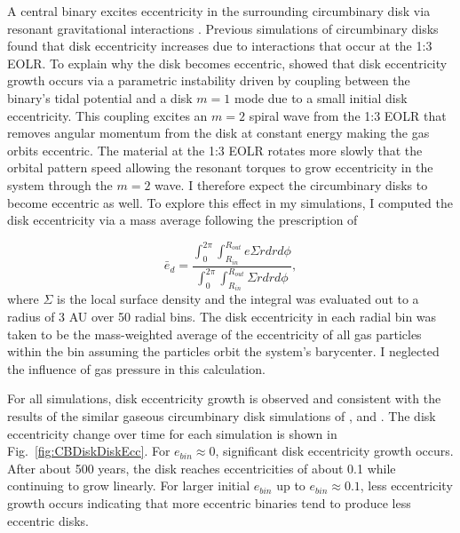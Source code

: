 A central binary excites eccentricity in the surrounding
circumbinary disk via resonant gravitational interactions
\citep{Papaloizou2001,Artymowicz1996a}.  Previous simulations of circumbinary
disks \citep{Kley2008,Papaloizou2001,Pierens2007,Pierens2013} found
that disk eccentricity increases due to interactions that occur at
the 1:3 EOLR.  To explain why the disk becomes eccentric, \citet{Papaloizou2001} showed that disk eccentricity growth occurs via a parametric instability driven by coupling between the binary's tidal potential and a disk $m = 1$ mode due to a small initial disk eccentricity.  This coupling excites an $m = 2$ spiral wave from the 1:3 EOLR that removes angular momentum from the disk at constant energy making the gas orbits eccentric.  The material at the 1:3 EOLR rotates more slowly that the orbital pattern speed allowing the resonant torques to grow eccentricity in the system through the $m = 2$ wave.  I therefore expect the circumbinary disks to become eccentric as well.  To explore this effect in my simulations, I computed the disk eccentricity via a mass average following the prescription of \citet{Pierens2007}

\begin{equation}
\bar{e}_d = \frac{\int_0^{2 \pi} \int^{R_{out}}_{R_{in}} e \Sigma r dr d\phi }{\int_0^{2 \pi} \int^{R_{out}}_{R_{in}} \Sigma r dr d\phi},
\end{equation}
where $\Sigma$ is the local surface density and the integral was
evaluated out to a radius of 3 AU over 50 radial bins.  The disk eccentricity in each radial bin was taken to be the mass-weighted average of the eccentricity of all gas particles within the bin assuming the particles orbit the system's barycenter.  I neglected the influence of gas pressure in this calculation.

For all simulations, disk eccentricity growth is observed and consistent with the results
of the similar gaseous circumbinary disk simulations of \citet{Kley2008}, \citet{Pierens2007,Pierens2013} and \citet{Farris2014}.  The disk eccentricity 
change over time for each simulation is shown in Fig.~\ref{fig:CBDiskDiskEcc}. For $e_{bin} \approx 0$, significant disk eccentricity growth occurs.  
After about 500 years, the disk reaches eccentricities of about 0.1 while continuing to grow linearly.  For larger initial $e_{bin}$ up 
to $e_{bin} \approx 0.1$, less eccentricity growth occurs indicating that more eccentric binaries tend to produce less eccentric disks.

